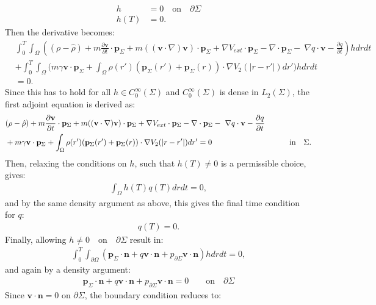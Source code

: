 \documentclass[11pt, a4paper]{article}
\newcommand{\Sta}{\rho}
\newcommand{\Stav}{\mathbf{v}}
\newcommand{\Adja}{\mathbf{p}_\Sigma}
\newcommand{\Adjb}{q}
\newcommand{\Adjc}{p_{\partial \Sigma}}
\theoremstyle{definition}
\begin{document}
\begin{align*}
h&=0 \quad \text{on} \quad \partial \Sigma\\
h(T)&=0.
\end{align*}
Then the derivative becomes:
\begin{align*}
 &\int_0^T \int_\Omega ( (\Sta - \hat \Sta) +m  \frac{\partial \Stav}{\partial t}\cdot \Adja + m  ((\Stav \cdot \nabla)\Stav )\cdot \Adja+ \nabla V_{ext}\cdot \Adja -\nabla\cdot \Adja  - \ \nabla \Adjb \cdot \Stav  -  \frac{\partial \Adjb}{\partial t}) h dr dt \\
 &+ \int_0^T \int_\Omega \bigg( m \gamma \Stav \cdot \Adja+ \int_\Omega  \rho(r')(\Adja(r') + \Adja(r)) \cdot\nabla V_2(|r-r'|)   dr'  \bigg)hdr dt\\
 &=0.
\end{align*}
Since this has to hold for all $h \in C_0^\infty(\Sigma)$ and $C_0^\infty(\Sigma)$ is dense in $L_2(\Sigma)$, the first adjoint equation is derived as:
\begin{align}
&(\Sta - \hat \Sta) +m  \frac{\partial \Stav}{\partial t}\cdot \Adja + m ( (\Stav \cdot \nabla)\Stav) \cdot \Adja+ \nabla V_{ext}\cdot \Adja -\nabla\cdot \Adja  - \ \nabla \Adjb \cdot \Stav  -  \frac{\partial \Adjb}{\partial t}\\
&+ m \gamma \Stav \cdot \Adja + \int_\Omega  \rho(r')(\Adja(r') + \Adja(r)) \cdot\nabla V_2(|r-r'|)   dr'  =0 \qquad\qquad\qquad\qquad\qquad \text{in} \quad \Sigma .\notag
\end{align}
Then, relaxing the conditions on $h$, such that $h(T) \neq 0$ is a permissible choice, gives:
\begin{align*}
\int_\Omega h(T) \Adjb(T) dr dt=0,
\end{align*}
and by the same density argument as above, this gives the final time condition for $\Adjb$:
\begin{align*}
\Adjb(T) = {0} .
\end{align*}
Finally, allowing $h \neq 0 \quad \text{on} \quad \partial \Sigma$ result in:
\begin{align*}
\int_0^T \int_{\partial \Omega} ( \Adja \cdot \mathbf{n}  +  \Adjb \Stav \cdot \mathbf{n}   +\Adjc \Stav \cdot \mathbf{n})h  dr dt=0,
\end{align*}
and again by a density argument:
\begin{align*}
 \Adja \cdot \mathbf{n}  +  \Adjb \Stav \cdot \mathbf{n}   +\Adjc \Stav \cdot \mathbf{n} = 0\qquad \text{on} \quad \partial \Sigma
\end{align*}
Since $\Stav \cdot \mathbf{n} =0$ on $ \partial \Sigma$, the boundary condition reduces to:
\end{document}
